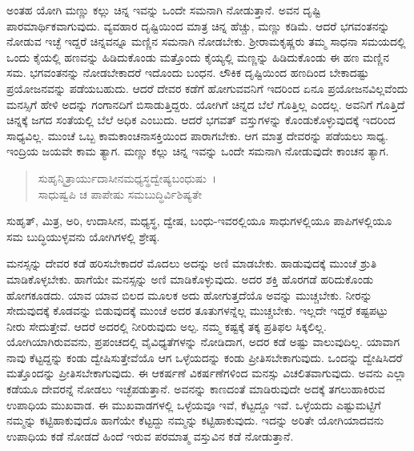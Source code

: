 ಅಂತಹ ಯೋಗಿ ಮಣ್ಣು ಕಲ್ಲು ಚಿನ್ನ ಇವನ್ನು ಒಂದೇ ಸಮನಾಗಿ ನೋಡುತ್ತಾನೆ. ಅವನ ದೃಷ್ಟಿ ಪಾರಮಾರ್ಥಿಕವಾಗುವುದು. ವ್ಯವಹಾರ ದೃಷ್ಟಿಯಿಂದ ಮಾತ್ರ ಚಿನ್ನ ಹೆಚ್ಚು, ಮಣ್ಣು ಕಡಿಮೆ. ಆದರೆ ಭಗವಂತನನ್ನು ನೋಡುವ ಇಚ್ಛೆ ಇದ್ದರೆ ಚಿನ್ನವನ್ನೂ ಮಣ್ಣಿನ ಸಮನಾಗಿ ನೋಡಬೇಕು. ಶ‍್ರೀರಾಮಕೃಷ್ಣರು ತಮ್ಮ ಸಾಧನಾ ಸಮಯದಲ್ಲಿ ಒಂದು ಕೈಯಲ್ಲಿ ಹಣವನ್ನು ಹಿಡಿದುಕೊಂಡು ಮತ್ತೊಂದು ಕೈಯ್ಯಲ್ಲಿ ಮಣ್ಣನ್ನು ಹಿಡಿದುಕೊಂಡು ಈ ಹಣ ಮಣ್ಣಿನ ಸಮ. ಭಗವಂತನನ್ನು ನೋಡಬೇಕಾದರೆ ಇದೊಂದು ಬಂಧನ. ಲೌಕಿಕ ದೃಷ್ಟಿಯಿಂದ ಹಣದಿಂದ ಬೇಕಾದಷ್ಟು ಪ್ರಯೋಜನವನ್ನು ಪಡೆಯಬಹುದು. ಆದರೆ ದೇವರ ಕಡೆಗೆ ಹೋಗುವವನಿಗೆ ಇದರಿಂದ ಏನೂ ಪ್ರಯೋಜನವಿಲ್ಲವೆಂದು ಮನಸ್ಸಿಗೆ ಹೇಳಿ ಅದನ್ನು ಗಂಗಾನದಿಗೆ ಬಿಸಾಡುತ್ತಿದ್ದರು. ಯೋಗಿಗೆ ಚಿನ್ನದ ಬೆಲೆ ಗೊತ್ತಿಲ್ಲ ಎಂದಲ್ಲ. ಅವನಿಗೆ ಗೊತ್ತಿದೆ ಚಿನ್ನಕ್ಕೆ ಜಗದ ಸಂತೆಯಲ್ಲಿ ಬೆಲೆ ಅಧಿಕ ಎಂಬುದು. ಆದರೆ ಭಗವತ್ ವಸ್ತುಗಳನ್ನು ಕೊಂಡುಕೊಳ್ಳುವುದಕ್ಕೆ ಇದರಿಂದ ಸಾಧ್ಯವಿಲ್ಲ. ಮುಂಚೆ ಒಬ್ಬ ಕಾಮಕಾಂಚನಾಸಕ್ತಿಯಿಂದ ಪಾರಾಗಬೇಕು. ಆಗ ಮಾತ್ರ ದೇವರನ್ನು ಪಡೆಯಲು ಸಾಧ್ಯ. ಇಂದ್ರಿಯ ಜಯವೇ ಕಾಮ ತ್ಯಾಗ. ಮಣ್ಣು ಕಲ್ಲು ಚಿನ್ನ ಇವನ್ನು ಒಂದೇ ಸಮನಾಗಿ ನೋಡುವುದೇ ಕಾಂಚನ ತ್ಯಾಗ.

\begin{verse}
ಸುಹೃನ್ಮಿತ್ರಾರ್ಯುದಾಸೀನಮಧ್ಯಸ್ಥದ್ವೇಷ್ಯಬಂಧುಷು~।\\ಸಾಧುಷ್ವಪಿ ಚ ಪಾಪೇಷು ಸಮಬುದ್ಧಿರ್ವಿಶಿಷ್ಯತೇ 
\end{verse}

ಸುಹೃತ್, ಮಿತ್ರ, ಅರಿ, ಉದಾಸೀನ, ಮಧ್ಯಸ್ಥ, ದ್ವೇಷ, ಬಂಧು-ಇವರಲ್ಲಿಯೂ ಸಾಧುಗಳಲ್ಲಿಯೂ ಪಾಪಿಗಳಲ್ಲಿಯೂ ಸಮ ಬುದ್ಧಿಯುಳ್ಳವನು ಯೋಗಿಗಳಲ್ಲಿ ಶ್ರೇಷ್ಠ.

ಮನಸ್ಸನ್ನು ದೇವರ ಕಡೆ ಹರಿಸಬೇಕಾದರೆ ಮೊದಲು ಅದನ್ನು ಅಣಿ ಮಾಡಬೇಕು. ಹಾಡುವುದಕ್ಕೆ ಮುಂಚೆ ಶ್ರುತಿ ಮಾಡಿಕೊಳ್ಳಬೇಕು. ಹಾಗೆಯೇ ಮನಸ್ಸನ್ನು ಅಣಿ ಮಾಡಿಕೊಳ್ಳುವುದು. ಅದರ ಶಕ್ತಿ ಹೊರಗಡೆ ಹರಿದುಕೊಂಡು ಹೋಗಕೂಡದು. ಯಾವ ಯಾವ ಬಿಲದ ಮೂಲಕ ಅದು ಹೋಗುತ್ತದೆಯೊ ಅವನ್ನು ಮುಚ್ಚಬೇಕು. ನೀರನ್ನು ಸೇದುವುದಕ್ಕೆ ಕೊಡವನ್ನು ಬಿಡುವುದಕ್ಕೆ ಮುಂಚೆ ಅದರ ತೂತುಗಳನ್ನೆಲ್ಲ ಮುಚ್ಚಬೇಕು. ಇಲ್ಲದೇ ಇದ್ದರೆ ಕಷ್ಟಪಟ್ಟು ನೀರು ಸೇದುತ್ತೇವೆ. ಆದರೆ ಅದರಲ್ಲಿ ನೀರಿರುವುದು ಅಲ್ಪ. ನಮ್ಮ ಕಷ್ಟಕ್ಕೆ ತಕ್ಕ ಪ್ರತಿಫಲ ಸಿಕ್ಕಲಿಲ್ಲ. ಯೋಗಿಯಾಗಿರುವವನು, ಪ್ರಪಂಚದಲ್ಲಿ ವೈವಿಧ್ಯತೆಗಳನ್ನು ನೋಡಿದಾಗ, ಅದರ ಕಡೆ ಅಷ್ಟು ವಾಲುವುದಿಲ್ಲ. ಯಾವಾಗ ನಾವು ಕೆಟ್ಟದ್ದನ್ನು ಕಂಡು ದ್ವೇಷಿಸುತ್ತೇವೆಯೊ ಆಗ ಒಳ್ಳೆಯದನ್ನು ಕಂಡು ಪ್ರೀತಿಸಬೇಕಾಗುವುದು. ಒಂದನ್ನು ದ್ವೇಷಿಸಿದರೆ ಮತ್ತೊಂದನ್ನು ಪ್ರೀತಿಸಬೇಕಾಗುವುದು. ಈ ಆಕರ್ಷಣೆ ವಿಕರ್ಷಣೆಗಳಿಂದ ಮನಸ್ಸು ವಿಚಲಿತವಾಗುವುದು. ಅವನು ಎಲ್ಲಾ ಕಡೆಯೂ ದೇವರನ್ನೆ ನೋಡಲು ಇಚ್ಛೆಪಡುತ್ತಾನೆ. ಅವನನ್ನು ಕಾಣದಂತೆ ಮಾಡಿರುವುದೇ ಅದಕ್ಕೆ ತಗಲುಹಾಕಿರುವ ಉಪಾಧಿಯ ಮುಖವಾಡ. ಈ ಮುಖವಾಡಗಳಲ್ಲಿ ಒಳ್ಳೆಯವೂ ಇವೆ, ಕೆಟ್ಟದ್ದೂ ಇವೆ. ಒಳ್ಳೆಯದು ಎಷ್ಟುಮಟ್ಟಿಗೆ ನಮ್ಮನ್ನು ಕಟ್ಟಿಹಾಕುವುದೊ ಹಾಗೆಯೇ ಕೆಟ್ಟದ್ದು ನಮ್ಮನ್ನು ಕಟ್ಟಿಹಾಕುವುದು. ಇದನ್ನು ಅರಿತೇ ಯೋಗಿಯಾದವನು ಉಪಾಧಿಯ ಕಡೆ ನೋಡದೆ ಹಿಂದೆ ಇರುವ ಪರಮಾತ್ಮ ವಸ್ತುವಿನ ಕಡೆ ನೋಡುತ್ತಾನೆ.

